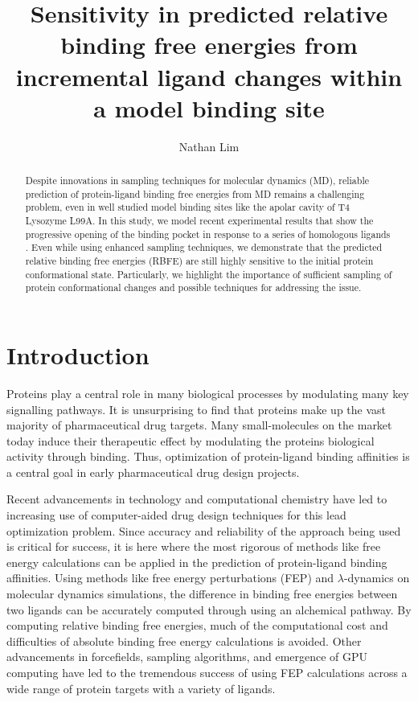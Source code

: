 \documentclass[journal=jctcce,manuscript=article]{achemso}
\author{Nathan Lim}
\affiliation[University of California, Irvine]
{Department of Pharmaceutical Sciences}
\title{Sensitivity in predicted relative binding free energies from incremental ligand changes within a model binding site}
\begin{document}
\begin{abstract}
Despite innovations in sampling techniques for molecular dynamics (MD), reliable prediction of protein-ligand binding free energies from MD remains a challenging problem, even in well studied model binding sites like the apolar cavity of T4 Lysozyme L99A.
In this study, we model recent experimental results that show the progressive opening of the binding pocket in response to a series of homologous ligands \cite{Merski2015}.
Even while using enhanced sampling techniques, we demonstrate that the predicted relative binding free energies (RBFE) are still highly sensitive to the initial protein conformational state.
Particularly, we highlight the importance of sufficient sampling of protein conformational changes and possible techniques for addressing the issue.
\end{abstract}

\pagebreak

\section{Introduction}
Proteins play a central role in many biological processes by modulating many key signalling pathways.
It is unsurprising to find that proteins make up the vast majority of pharmaceutical drug targets.
Many small-molecules on the market today induce their therapeutic effect by modulating the proteins biological activity through binding\cite{overington2006many,FCP:FCP548,Lundstrom2009}.
Thus, optimization of protein-ligand binding affinities is a central goal in early pharmaceutical drug design projects.

Recent advancements in technology and computational chemistry have led to increasing use of computer-aided drug design techniques for this lead optimization problem.
Since accuracy and reliability of the approach being used is critical for success, it is here where the most rigorous of methods like free energy calculations can be applied in the prediction of protein-ligand binding affinities.
Using methods like free energy perturbations (FEP) and $\lambda$-dynamics on molecular dynamics simulations, the difference in binding free energies between two ligands can be accurately computed through using an alchemical pathway.
By computing relative binding free energies, much of the computational cost and difficulties of absolute binding free energy calculations is avoided\cite{doi:10.1021/ct5000296,chipot2007free,chodera2011alchemical,knight2009lambda,zheng2008random,gallicchio2011advances,doi:10.1021/ct500161f}.
Other advancements in forcefields, sampling algorithms, and emergence of GPU computing have led to the tremendous success of using FEP calculations across a wide range of protein targets with a variety of ligands\cite{FEPplus}. 
\end{document}
